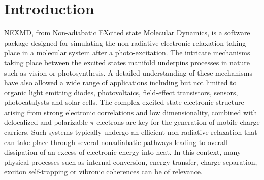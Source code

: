\section{Introduction}

NEXMD, from Non-adiabatic EXcited state Molecular Dynamics\cite{malone2020nexmd,nelson2020non}, is a software package designed for simulating the non-radiative electronic relaxation taking place in a molecular system after a photo-excitation. The intricate mechanisms taking place between the excited states manifold underpins processes in nature such as vision\cite{polli2010conical} or photosynthesis\cite{scholes2017using}. A detailed understanding of these mechanisms have also allowed a wide range of applications including but not limited to organic light emitting diodes\cite{salehi2019recent}, photovoltaics\cite{wang2014photodegradation,wolfer2014solution,zhugayevych2015theoretical}, field-effect transistors\cite{sirringhaus2000high,lee2016highly}, sensors\cite{satishkumar2007reversible,maksimov2019genetically,li2019perylene,wilson2008photoactive,singer2022unravelling}, photocatalysts\cite{romero2016organic} and solar cells\cite{bredas2009molecular,schmidt2011moving}. The complex excited state electronic structure arising from strong electronic correlations and low dimensionality\cite{tretiak2002conformational}, combined with delocalized and polarizable $\pi$-electrons are key for the generation of mobile charge carriers\cite{cao1999improved}. Such systems typically undergo an efficient non-radiative relaxation\cite{kasha1950characterization} that can take place through several nonadiabatic pathways leading to overall dissipation of an excess of electronic energy into heat. In this context, many physical processes such as internal conversion\cite{robb2000computational}, energy transfer\cite{jiang2017light}, charge separation\cite{huix2015concurrent,bredas2004charge}, exciton self-trapping\cite{adamska2014self} or vibronic coherences\cite{freixas2020vibronic,keefer2021monitoring,freixas2022ultrafast} can be of relevance.


